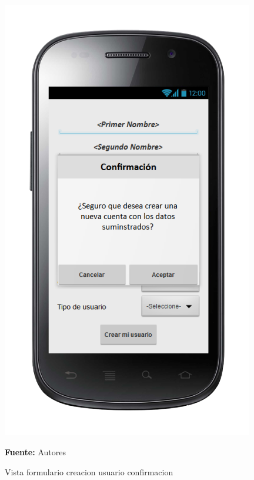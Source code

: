 \begin{figure}[!htb]
  \begin{center}
\includegraphics[width=11cm]{./imagenes/UI/Usuarios/formulario_creacion_usuario_confirmacion.png}
    \caption{Vista formulario creacion usuario confirmacion}
    \label{fig:Vista_formulario_creacion_usuario_confirmacion}
    \textbf{Fuente:}  Autores
  \end{center}
\end{figure}
